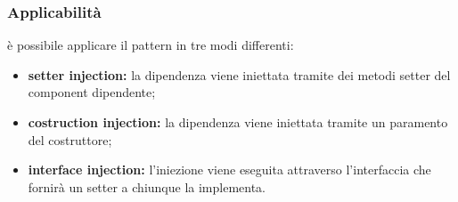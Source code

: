 \subsubsection{Applicabilità} è possibile applicare il pattern in tre modi differenti:
\begin{itemize}
	\item \textbf{setter injection:} la dipendenza viene iniettata tramite dei metodi setter del component dipendente;
	\item \textbf{costruction injection:} la dipendenza viene iniettata tramite un paramento del costruttore;
	\item \textbf{interface injection:} l'iniezione viene eseguita attraverso l'interfaccia che fornirà un setter a chiunque la implementa.
\end{itemize}
